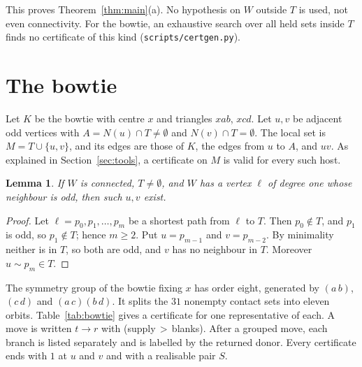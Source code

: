 \documentclass[11pt]{amsart}
\newtheorem{lemma}[theorem]{Lemma}
\theoremstyle{definition}
\newcommand{\tr}{\to}
\begin{document}
This proves Theorem~\ref{thm:main}(a). No hypothesis on $W$ outside $T$ is used, not even
connectivity. For the bowtie, an exhaustive search over all held sets inside $T$ finds no
certificate of this kind (\texttt{scripts/certgen.py}).

\section{The bowtie}\label{sec:bowtie}

Let $K$ be the bowtie with centre $x$ and triangles $xab$, $xcd$. Let $u,v$ be adjacent odd vertices
with $A=N(u)\cap T\neq\emptyset$ and $N(v)\cap T=\emptyset$. The local set is $M=T\cup\{u,v\}$, and
its edges are those of $K$, the edges from $u$ to $A$, and $uv$. As explained in
Section~\ref{sec:tools}, a certificate on $M$ is valid for every such host.

\begin{lemma}\label{lem:uv}
If $W$ is connected, $T\neq\emptyset$, and $W$ has a vertex $\ell$ of degree one whose neighbour is
odd, then such $u,v$ exist.
\end{lemma}

\begin{proof}
Let $\ell=p_0,p_1,\dots,p_m$ be a shortest path from $\ell$ to $T$. Then $p_0\notin T$, and $p_1$ is
odd, so $p_1\notin T$; hence $m\ge2$. Put $u=p_{m-1}$ and $v=p_{m-2}$. By minimality neither is in
$T$, so both are odd, and $v$ has no neighbour in $T$. Moreover $u\sim p_m\in T$.
\end{proof}

The symmetry group of the bowtie fixing $x$ has order eight, generated by $(a\,b)$, $(c\,d)$ and
$(a\,c)(b\,d)$. It splits the $31$ nonempty contact sets into eleven orbits. Table~\ref{tab:bowtie}
gives a certificate for one representative of each. A move is written $t\tr r$ with
(supply$\,>\,$blanks). After a grouped move, each branch is listed separately and is labelled by the
returned donor. Every certificate ends with $1$ at $u$ and $v$ and with a realisable pair $S$.
\end{document}
